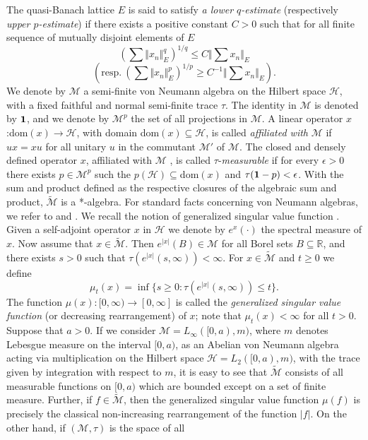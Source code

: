 \documentclass[12pt]{amsart}
\let\cal\mathcal
\def\m{{\cal M}}
\def\mt{\widetilde{\cal M}}
\def\nmt{\widetilde {\cal M}}
\def\nm{{\cal M}}
\numberwithin{equation}{section}
\numberwithin{theorem}{section}
\begin{document}
The quasi-Banach lattice $E$ is said to satisfy {\it a lower $q$-estimate}
(respectively {\it upper $p$-estimate}) if there exists a positive constant
$C>0$ such that for all finite sequence of mutually disjoint elements of $E$
$$(\sum \Vert x_n \Vert_{E}^q)^{1/q} \leq C \Vert \sum x_n \Vert_E$$
$$\left( \text{resp.}\ 
(\sum \Vert x_n \Vert_{E}^p)^{1/p} \geq C^{-1} \Vert \sum x_n \Vert_E
\right).$$
 We denote by
${\cal M}$ a semi-finite von Neumann algebra on the Hilbert space
${\cal H}$, with a fixed faithful and normal semi-finite trace $\tau $. The
identity in ${\cal M}$  is denoted by ${\bf 1}$, and we denote by
$ {\cal M}^p$ the
set of all projections in ${\cal M}$. A linear operator
$x$:dom$(x)\to {\cal H} $, with domain
dom$(x)\subseteq {\cal H}$, is called {\it affiliated with}  $\m$  if
$ux=xu$ for all unitary $u$ in the commutant $\nm'$ of $\m.$
The closed and densely defined operator $x$, affiliated with
${\cal M}$ , is called
$\tau$-{\it measurable} if for every $\epsilon >0$ there exists
$p\in \nm^p$ such the $p({\cal H})\subseteq$dom$(x)$ and
$\tau({\bf 1}-p)<\epsilon$.  With the sum and product defined as
the respective
closures of the algebraic sum and product, $\mt $ is a *-algebra.
 For standard facts concerning von Neumann
algebras, we refer to \cite{KR} and \cite{TAK}.
\smallskip
\noindent
We recall the notion of generalized singular value function \cite{FK}.
Given a self-adjoint operator $x$ in ${\cal H}$ we denote by $e^x(\cdot
)$ the spectral measure of $x$. Now assume that $x\in\nmt$.
 Then $e^{\vert x\vert}(B)\in\nm$ for all Borel sets $B\subseteq{\mathbb R}$,
and there exists $s>0$ such that
$\tau (e^{\vert x\vert}(s,\infty))<\infty$.
 For $x\in\nmt$ and $t\geq 0$ we define
$$
\mu_t(x)=\inf\{s\geq 0 : \tau (e^{\vert x\vert}(s,\infty))\leq t\}.
$$
The function $\mu(x):[0,\infty)\to [0,\infty ]$ is called the {\it
generalized singular value function} (or decreasing rearrangement) of
$x$; note that $\mu_t(x)<\infty$ for all $t>0$.
 Suppose that $a >0$. If we consider $\nm =L_\infty([0,a),m)$,
 where $m$ denotes Lebesgue
measure on the interval $[0,a)$, as an Abelian von Neumann algebra
acting via
multiplication on the Hilbert space  ${\cal H}=L_2([0,a),m)$,
with the
trace given by integration with respect to $m$, it is easy to see that
$\nmt $ consists of all measurable functions on $[0,a )$ which are
bounded
except on a set of finite measure. Further, if $f\in\nmt$, then the
generalized singular value function $\mu(f)$ is precisely the classical
non-increasing rearrangement of the function $\vert f\vert$.
On the other hand, if $({\cal M},\tau)$ is the space of all
\end{document}
